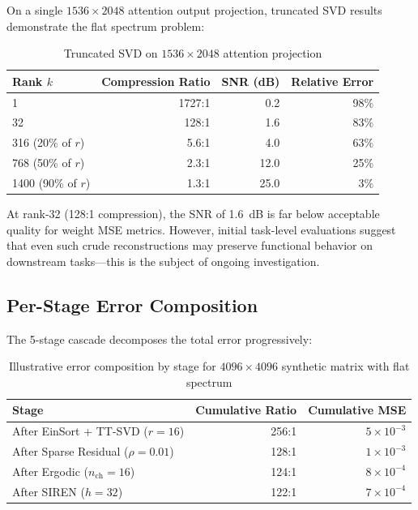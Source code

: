 \documentclass[11pt,a4paper]{article}
\begin{document}
On a single $1536 \times 2048$ attention output projection, truncated SVD results
demonstrate the flat spectrum problem:

\begin{table}[H]
	\centering
	\caption{Truncated SVD on $1536 \times 2048$ attention projection}
	\label{tab:svd_results}
	\begin{tabular}{@{}lrrr@{}}
		\toprule
		Rank $k$           & Compression Ratio & SNR (dB) & Relative Error \\
		\midrule
		1                  & 1727:1            & 0.2      & 98\%           \\
		32                 & 128:1             & 1.6      & 83\%           \\
		316 (20\% of $r$)  & 5.6:1             & 4.0      & 63\%           \\
		768 (50\% of $r$)  & 2.3:1             & 12.0     & 25\%           \\
		1400 (90\% of $r$) & 1.3:1             & 25.0     & 3\%            \\
		\bottomrule
	\end{tabular}
\end{table}

At rank-32 (128:1 compression), the SNR of 1.6~dB is far below acceptable quality for
weight MSE metrics. However, initial task-level evaluations suggest that even such
crude reconstructions may preserve functional behavior on downstream tasks---this is
the subject of ongoing investigation.

\subsection{Per-Stage Error Composition}

The 5-stage cascade decomposes the total error progressively:

\begin{table}[H]
	\centering
	\caption{Illustrative error composition by stage for $4096 \times 4096$ synthetic matrix with flat spectrum}
	\label{tab:stage_errors}
	\begin{tabular}{@{}lrr@{}}
		\toprule
		Stage                               & Cumulative Ratio & Cumulative MSE     \\
		\midrule
		After EinSort + TT-SVD ($r=16$)     & 256:1            & $5 \times 10^{-3}$ \\
		After Sparse Residual ($\rho=0.01$) & 128:1            & $1 \times 10^{-3}$ \\
		After Ergodic ($n_{\text{ch}}=16$)  & 124:1            & $8 \times 10^{-4}$ \\
		After SIREN ($h=32$)                & 122:1            & $7 \times 10^{-4}$ \\
		\bottomrule
	\end{tabular}
\end{table}
\end{document}
